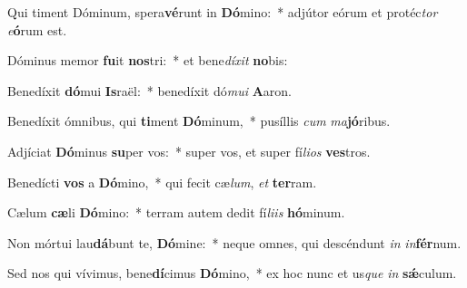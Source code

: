 \item Qui timent Dóminum, spera\textbf{vé}runt in \textbf{Dó}mino:~* adjútor eórum et protéc\textit{tor} \textit{e}\textbf{ó}rum est.
\item Dóminus memor \textbf{fu}it \textbf{nos}tri:~* et bene\textit{dí}\textit{xit} \textbf{no}bis:
\item Benedíxit \textbf{dó}mui \textbf{Is}raël:~* benedíxit dó\textit{mu}\textit{i} \textbf{A}aron.
\item Benedíxit ómnibus, qui \textbf{ti}ment \textbf{Dó}minum,~* pusíllis \textit{cum} \textit{ma}\textbf{jó}ribus.
\item Adjíciat \textbf{Dó}minus \textbf{su}per vos:~* super vos, et super fí\textit{li}\textit{os} \textbf{ves}tros.
\item Benedícti \textbf{vos} a \textbf{Dó}mino,~* qui fecit cæ\textit{lum}, \textit{et} \textbf{ter}ram.
\item Cælum \textbf{cæ}li \textbf{Dó}mino:~* terram autem dedit fí\textit{li}\textit{is} \textbf{hó}minum.
\item Non mórtui lau\textbf{dá}bunt te, \textbf{Dó}mine:~* neque omnes, qui descéndunt \textit{in} \textit{in}\textbf{fér}num.
\item Sed nos qui vívimus, bene\textbf{dí}cimus \textbf{Dó}mino,~* ex hoc nunc et us\textit{que} \textit{in} \textbf{sǽ}culum.
